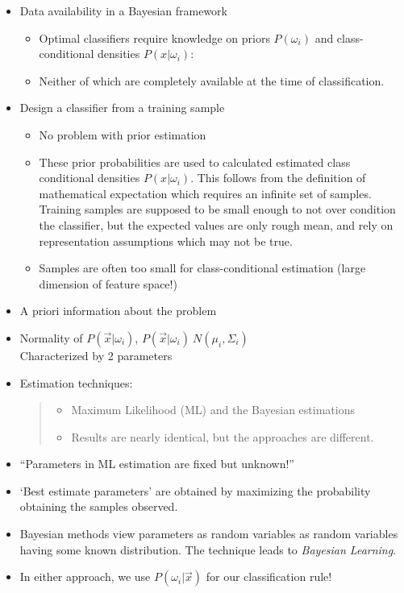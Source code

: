 \documentclass[11pt]{article}
\begin{document}
\begin{itemize}
	\item Data availability in a Bayesian framework
	\begin{itemize}
		\item Optimal classifiers require knowledge on priors $P(\omega_i)$ and class-conditional densities $P(x|\omega_i)$:
		\item Neither of which are completely available at the time of classification.
	\end{itemize}
	
	\item Design a classifier from a training sample
	\begin{itemize}
		\item No problem with prior estimation
		\item These prior probabilities are used to calculated estimated class conditional densities $P(x|\omega_i)$.  This follows from the definition of mathematical expectation which requires an infinite set of samples.  Training samples are supposed to be small enough to not over condition the classifier, but the expected values are only rough mean, and rely on representation assumptions which may not be true.
		\item Samples are often too small for class-conditional estimation (large dimension of feature space!)
	\end{itemize}
	\item A priori information about the problem 
	\item Normality of $P(\vec{x}| \omega_i)$, $P (\vec{x} | \omega_i) ~ N(\mu_i, \Sigma_i)$ \\
	Characterized by 2 parameters
	\item Estimation techniques:
	\begin{quote}
		\begin{itemize}
			\item Maximum Likelihood (ML) and the Bayesian estimations
			\item Results are nearly identical, but the approaches are different.
		\end{itemize} \cite{slides}	
	\end{quote}
	\item ``Parameters in ML estimation are fixed but unknown!''
	\item `Best estimate parameters' are obtained by maximizing the probability obtaining the samples observed.
	\item Bayesian methods view parameters as random variables as random variables having some known distribution.  The technique leads to \textsl{Bayesian Learning}.
	\item In either approach, we use $P(\omega_i | \vec{x})$ for our classification rule!
\end{itemize}
\end{document}
